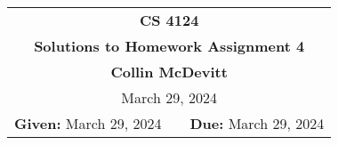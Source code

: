 \documentclass[11pt,twoside]{article}
\newcommand{\coursenumber}{CS 4124}
\newcommand{\docdate}{March 14, 2024}
\newcommand{\duedate}{March 29, 2024}
\newcommand{\homeworknumber}{4}
\newcommand{\doctitle}{Solutions to Homework Assignment \homeworknumber}
\newcommand{\doctitle}{Homework Assignment \homeworknumber}
\renewcommand{\docdate}{\duedate}
\renewcommand{\author}{Collin McDevitt}
\begin{document}
\thispagestyle{empty}

\begin{center}
\begin{tabular}{lcr}
\multicolumn{3}{c}{\Large\textbf{\coursenumber}}
\\[0.04in]
\multicolumn{3}{c}{\Large\textbf{\doctitle}}
\ifthenelse{\boolean{solutions}}{%
\\[0.04in]\multicolumn{3}{c}{\large\textbf{\author}}
}{} %
\ifthenelse{\boolean{solutions}}{%
\\[0.10in]\multicolumn{3}{c}{\duedate}
}{%
\\[0.10in]
\textbf{Given:} \docdate
& \hspace*{1.0in} &
\textbf{Due:} \duedate
}
\end{tabular}
\end{center}
\end{document}
